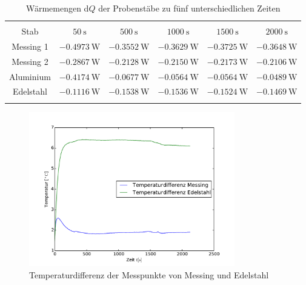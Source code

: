 \begin{table}
\centering
\begin{tabular}{cccccc}
\sisetup{table-format=1.4}\\
Stab & $50\:\si\second$ & $500\:\si\second$ & $1000\:\si\second$ & $1500\:\si\second$ & $2000\:\si\second$ \\
\toprule
Messing 1 &$-0.4973\:\si{\watt}$ &$-0.3552\:\si{\watt}$&$-0.3629\:\si{\watt}$&$-0.3725\:\si{\watt}$&$-0.3648\:\si{\watt}$\\
Messing 2 &$-0.2867\:\si{\watt}$& $-0.2128\:\si{\watt}$&$-0.2150\:\si{\watt}$&$-0.2173\:\si{\watt}$&$-0.2106\:\si{\watt}$\\
Aluminium &$-0.4174\:\si{\watt}$&$-0.0677\:\si{\watt}$&$-0.0564\:\si{\watt}$&$-0.0564\:\si{\watt}$&$-0.0489\:\si{\watt}$\\
Edelstahl &$-0.1116\:\si{\watt}$&$-0.1538\:\si{\watt}$&$-0.1536\:\si{\watt}$&$-0.1524\:\si{\watt}$&$-0.1469\:\si{\watt}$\\
\bottomrule
\label{tab:waememengen}
\end{tabular}
\caption{Wärmemengen d$Q$ der Probenstäbe zu fünf unterschiedlichen Zeiten}
\end{table}

\begin{figure}[htp]
	\label{fig:tempverl}
	\centering
	\includegraphics[width=0.8\textwidth]{Bilder/M1_Tempdiff.pdf}
	\caption{Temperaturdifferenz der Messpunkte von Messing und Edelstahl}
\end{figure}

